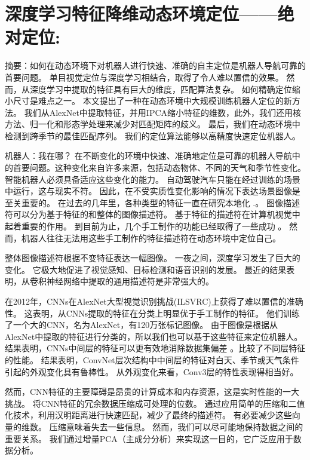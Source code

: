 \section{深度学习特征降维动态环境定位——绝对定位:}
\label{dynamic}
摘要：如何在动态环境下对机器人进行快速、准确的自主定位是机器人导航可靠的首要问题。 单目视觉定位与深度学习相结合，取得了令人难以置信的效果。 然而，从深度学习中提取的特征具有巨大的维度，匹配算法复杂。 如何精确定位缩小尺寸是难点之一。 本文提出了一种在动态环境中大规模训练机器人定位的新方法。 我们从AlexNet中提取特征，并用IPCA缩小特征的维数，此外，我们还用核方法、归一化和形态学处理来减少对匹配矩阵的歧义。 最后，我们在动态环境中检测到跨季节的最佳匹配序列。 我们的定位算法能够以高精度快速定位机器人。

机器人：我在哪？ 在不断变化的环境中快速、准确地定位是可靠的机器人导航中的首要问题。这种变化来自许多来源，包括动态物体、不同的天气和季节性变化。 智能机器人必须具备适应这些变化的能力。 自动驾驶汽车只能在经过训练的场景中运行，这与现实不符。 因此，在不受实质性变化影响的情况下表达场景图像是至关重要的。 在过去的几年里，各种类型的特征一直在研究本地化\cite{cummins2008fab} \cite{sunderhauf2011brief} \cite{milford2012seqslam} \cite{arroyo2014fast}.。 图像描述符可以分为基于特征的和整体的图像描述符。 基于特征的描述符在计算机视觉中起着重要的作用。 到目前为止，几个手工制作的功能已经取得了一些成功\cite{lowe2004distinctive} \cite{tola2008fast} \cite{SURF2006surf} \cite{ORB2011orb}。 然而，机器人往往无法用这些手工制作的特征描述符在动态环境中定位自己。

整体图像描述符根据不变特征表达一幅图像。 一夜之间，深度学习发生了巨大的变化。 它极大地促进了视觉感知、目标检测和语音识别的发展\cite{tai2016deep}。 最近的结果表明，从卷积神经网络中提取的通用描述符是非常强大的\cite{Sharif2014cnn}。

在2012年，CNNs在AlexNet大型视觉识别挑战(ILSVRC)上获得了难以置信的准确性\cite{krizhevsky2012imagenet}。 这表明，从CNNs提取的特征在分类上明显优于手工制作的特征。 他们训练了一个大的CNN，名为AlexNet，有120万张标记图像。 由于图像是根据从AlexNet中提取的特征进行分类的，所以我们也可以基于这些特征来定位机器人。 结果表明，CNNs中间层的特征可以更有效地消除数据集偏差 \cite{donahue2014decaf}。\cite{sunderhauf2015performance}比较了不同层特征的性能。 结果表明，ConvNet层次结构中中间层的特征对白天、季节或天气条件引起的外观变化具有鲁棒性。 从外观变化来看，Conv3层的特性表现得相当好。

然而，CNN特征的主要障碍是昂贵的计算成本和内存资源，这是实时性能的一大挑战。\cite{arroyo2016fusion} 将CNN特征的冗余数据压缩成可处理的位数。 通过应用简单的压缩和二值化技术，利用汉明距离进行快速匹配，减少了最终的描述符。 有必要减少这些向量的维数。 压缩意味着失去一些信息。 然而，我们可以尽可能地保持数据之间的重要关系。 我们通过增量PCA（主成分分析）来实现这一目的，它广泛应用于数据分析\cite{weng2003c和id}。



